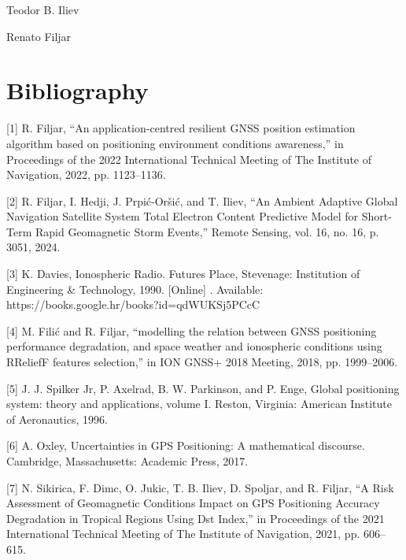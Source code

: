 \documentclass[sn-mathphys-num]{sn-jnl}%
\begin{document}
Teodor B. Iliev

Renato Filjar


\section{Bibliography}
[1] R. Filjar, “An application-centred resilient GNSS position estimation algorithm based on positioning environment conditions awareness,” in Proceedings of the 2022 International Technical Meeting of The Institute of Navigation, 2022, pp. 1123–1136.

[2] R. Filjar, I. Hedji, J. Prpić-Oršić, and T. Iliev, “An Ambient Adaptive Global Navigation Satellite System Total Electron Content Predictive Model for Short-Term Rapid Geomagnetic Storm Events,” Remote Sensing, vol. 16, no. 16, p. 3051, 2024.

[3] K. Davies, Ionospheric Radio. Futures Place, Stevenage: Institution of Engineering & Technology, 1990. [Online] . Available: https://books.google.hr/books?id=qdWUKSj5PCcC

[4] M. Filić and R. Filjar, “modelling the relation between GNSS positioning performance degradation, and space weather and ionospheric conditions using RReliefF features selection,” in ION GNSS+ 2018 Meeting, 2018, pp. 1999–2006.

[5] J. J. Spilker Jr, P. Axelrad, B. W. Parkinson, and P. Enge, Global positioning system: theory and applications, volume I. Reston, Virginia: American Institute of Aeronautics, 1996.

[6] A. Oxley, Uncertainties in GPS Positioning: A mathematical discourse. Cambridge, Massachusetts: Academic Press, 2017.

[7] N. Sikirica, F. Dimc, O. Jukic, T. B. Iliev, D. Spoljar, and R. Filjar, “A Risk Assessment of Geomagnetic Conditions Impact on GPS Positioning Accuracy Degradation in Tropical Regions Using Dst Index,” in Proceedings of the 2021 International Technical Meeting of The Institute of Navigation, 2021, pp. 606–615.
\end{document}
